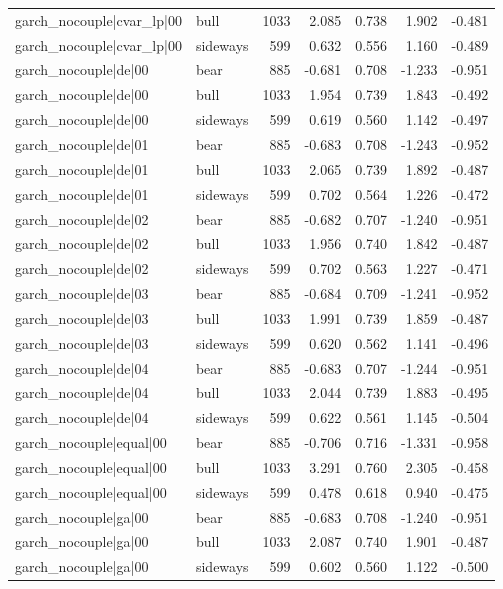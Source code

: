\begin{table}
\begin{tabular}{llrrrrr}
garch\_nocouple|cvar\_lp|00 & bull & 1033 & 2.085 & 0.738 & 1.902 & -0.481 \\
garch\_nocouple|cvar\_lp|00 & sideways & 599 & 0.632 & 0.556 & 1.160 & -0.489 \\
garch\_nocouple|de|00 & bear & 885 & -0.681 & 0.708 & -1.233 & -0.951 \\
garch\_nocouple|de|00 & bull & 1033 & 1.954 & 0.739 & 1.843 & -0.492 \\
garch\_nocouple|de|00 & sideways & 599 & 0.619 & 0.560 & 1.142 & -0.497 \\
garch\_nocouple|de|01 & bear & 885 & -0.683 & 0.708 & -1.243 & -0.952 \\
garch\_nocouple|de|01 & bull & 1033 & 2.065 & 0.739 & 1.892 & -0.487 \\
garch\_nocouple|de|01 & sideways & 599 & 0.702 & 0.564 & 1.226 & -0.472 \\
garch\_nocouple|de|02 & bear & 885 & -0.682 & 0.707 & -1.240 & -0.951 \\
garch\_nocouple|de|02 & bull & 1033 & 1.956 & 0.740 & 1.842 & -0.487 \\
garch\_nocouple|de|02 & sideways & 599 & 0.702 & 0.563 & 1.227 & -0.471 \\
garch\_nocouple|de|03 & bear & 885 & -0.684 & 0.709 & -1.241 & -0.952 \\
garch\_nocouple|de|03 & bull & 1033 & 1.991 & 0.739 & 1.859 & -0.487 \\
garch\_nocouple|de|03 & sideways & 599 & 0.620 & 0.562 & 1.141 & -0.496 \\
garch\_nocouple|de|04 & bear & 885 & -0.683 & 0.707 & -1.244 & -0.951 \\
garch\_nocouple|de|04 & bull & 1033 & 2.044 & 0.739 & 1.883 & -0.495 \\
garch\_nocouple|de|04 & sideways & 599 & 0.622 & 0.561 & 1.145 & -0.504 \\
garch\_nocouple|equal|00 & bear & 885 & -0.706 & 0.716 & -1.331 & -0.958 \\
garch\_nocouple|equal|00 & bull & 1033 & 3.291 & 0.760 & 2.305 & -0.458 \\
garch\_nocouple|equal|00 & sideways & 599 & 0.478 & 0.618 & 0.940 & -0.475 \\
garch\_nocouple|ga|00 & bear & 885 & -0.683 & 0.708 & -1.240 & -0.951 \\
garch\_nocouple|ga|00 & bull & 1033 & 2.087 & 0.740 & 1.901 & -0.487 \\
garch\_nocouple|ga|00 & sideways & 599 & 0.602 & 0.560 & 1.122 & -0.500 \\

\end{tabular}
\end{table}
